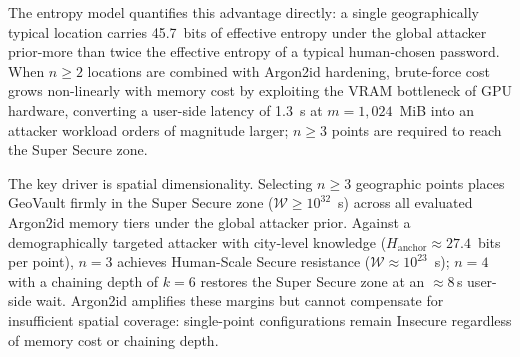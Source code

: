 \documentclass[journal,article,submit,pdftex,moreauthors]{Definitions/mdpi}
\newcommand{\add}[1]{#1}
\newcommand{\remove}[1]{}
\newcommand{\add}[1]{\added{#1}}
\newcommand{\remove}[1]{\deleted{#1}}
\begin{document}
\remove{Through information-theoretic analysis, we showed that spatially anchored secrets exhibit a substantially higher effective entropy floor than human-chosen passwords under realistic attacker priors. Empirical benchmarking further demonstrated that when this spatial entropy is combined with a memory-hard key derivation function such as Argon2id, brute-force resistance becomes strongly influenced by hardware constraints. In particular, increasing memory costs toward GPU VRAM limits results in a pronounced, non-linear reduction in attacker throughput, creating a favorable asymmetry between legitimate users and offline adversaries.}\add{The entropy model quantifies this advantage directly: a single geographically typical location carries 45.7~bits of effective entropy under the global attacker prior-more than twice the effective entropy of a typical human-chosen password. When $n \geq 2$ locations are combined with Argon2id hardening, brute-force cost grows non-linearly with memory cost by exploiting the VRAM bottleneck of GPU hardware, converting a user-side latency of 1.3~s at $m=1{,}024$~MiB into an attacker workload orders of magnitude larger; $n \geq 3$ points are required to reach the Super Secure zone.}

\remove{The results indicate that GeoVault can achieve attacker-adjusted work factors that approach or exceed those associated with the 128-bit security baseline of BIP-39 mnemonics. The primary driver is spatial dimensionality: selecting $n \geq 3$ geographic points places the system firmly in the Super Secure zone across all evaluated Argon2id memory tiers, and this holds even under a demographically targeted attacker who restricts the search to an urban spatial dictionary ($H_\text{anchor} \approx 27.4$\,bits). Computational hardening via Argon2id amplifies these margins and provides a tunable usability-security trade-off, but cannot substitute for adequate spatial dimensionality: single-point configurations remain in the Insecure zone under the targeted-attacker prior regardless of memory cost or chaining depth.}\add{The key driver is spatial dimensionality. Selecting $n \geq 3$ geographic points places GeoVault firmly in the Super Secure zone ($\mathcal{W} \geq 10^{32}$~s) across all evaluated Argon2id memory tiers under the global attacker prior. Against a demographically targeted attacker with city-level knowledge ($H_\text{anchor} \approx 27.4$~bits per point), $n=3$ achieves Human-Scale Secure resistance ($\mathcal{W} \approx 10^{23}$~s); $n=4$ with a chaining depth of $k=6$ restores the Super Secure zone at an $\approx$8\,s user-side wait. Argon2id amplifies these margins but cannot compensate for insufficient spatial coverage: single-point configurations remain Insecure regardless of memory cost or chaining depth.}
\end{document}

